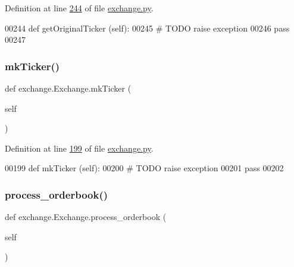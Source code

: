 Definition at line \hyperlink{exchange_8py_source_l00244}{244} of file \hyperlink{exchange_8py_source}{exchange.\+py}.


\begin{DoxyCode}
00244     \textcolor{keyword}{def }getOriginalTicker (self):
00245         \textcolor{comment}{# TODO raise exception}
00246         \textcolor{keywordflow}{pass}
00247     
\end{DoxyCode}
\mbox{\label{classexchange_1_1_exchange_af7512183a26d97ea60a4f44608f40a0a}} 
\subsubsection{\texorpdfstring{mk\+Ticker()}{mkTicker()}}
{\footnotesize\ttfamily def exchange.\+Exchange.\+mk\+Ticker (\begin{DoxyParamCaption}\item[{}]{self }\end{DoxyParamCaption})}



Definition at line \hyperlink{exchange_8py_source_l00199}{199} of file \hyperlink{exchange_8py_source}{exchange.\+py}.


\begin{DoxyCode}
00199     \textcolor{keyword}{def }mkTicker (self): 
00200         \textcolor{comment}{# TODO raise exception}
00201         \textcolor{keywordflow}{pass}
00202     
\end{DoxyCode}
\mbox{\label{classexchange_1_1_exchange_a93c60cd18eab808d68191fb1d2d42cf8}} 
\subsubsection{\texorpdfstring{process\+\_\+orderbook()}{process\_orderbook()}}
{\footnotesize\ttfamily def exchange.\+Exchange.\+process\+\_\+orderbook (\begin{DoxyParamCaption}\item[{}]{self }\end{DoxyParamCaption})}



